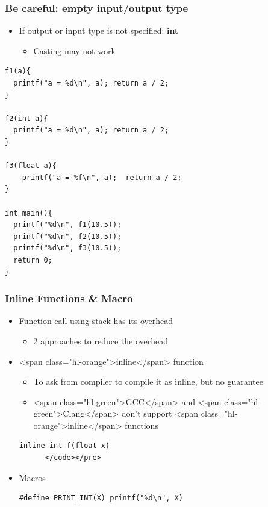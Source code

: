 \documentclass{../c-lecture}
\begin{document}
\begin{frame}[fragile]
  \frametitle{Be careful: empty input/output type}
  \begin{itemize}
    \item
      If output or input type is not specified:
      \textbf{\color{Orange} int}
    \begin{itemize}
      \item Casting may not work
    \end{itemize}
  \end{itemize}
  \begin{verbatim}
f1(a){
  printf("a = %d\n", a); return a / 2;
}

f2(int a){
  printf("a = %d\n", a); return a / 2;
}

f3(float a){
    printf("a = %f\n", a);  return a / 2;
}

int main(){
  printf("%d\n", f1(10.5));
  printf("%d\n", f2(10.5));
  printf("%d\n", f3(10.5));
  return 0;
}
  \end{verbatim}
\end{frame}

\begin{frame}[fragile]
  \frametitle{Inline Functions \& Macro}
  \begin{itemize}
    \item Function call using stack has its overhead
    \begin{itemize}
      \item 2 approaches to reduce the overhead
    \end{itemize}
    \item <span class="hl-orange">inline</span> function
    \begin{itemize}
      \item To ask from compiler to compile it as inline, but no guarantee
      \item
        <span class="hl-green">GCC</span> and
        <span class="hl-green">Clang</span> don't support
        <span class="hl-orange">inline</span> functions
    \end{itemize}
    \begin{verbatim}
inline int f(float x)
      </code></pre>
    \end{verbatim}
    \item Macros
    \begin{verbatim}
#define PRINT_INT(X) printf("%d\n", X)
    \end{verbatim}
  \end{itemize}
\end{frame}
\end{document}
